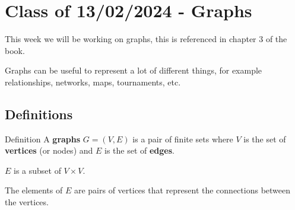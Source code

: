 \documentclass[10pt]{extarticle}
\begin{document}
\section{Class of 13/02/2024 - Graphs}

This week we will be working on graphs, this is referenced in chapter 3 of the book.

\begin{center}

     \label{fig:graph}
\end{center}

Graphs can be useful to represent a lot of different things,
for example relationships, networks, maps, tournaments, etc.

\subsection{Definitions}

\begin{bluebox}{Definition}
    A \textbf{graphs} $G = (V, E)$ is a pair of finite sets where
    $V$ is the set of \textbf{vertices} (or nodes) and $E$ is the set of \textbf{edges}.

    $E$ is a subset of $V \times V$.
\end{bluebox}

The elements of $E$ are pairs of vertices that represent the connections between the vertices.
\end{document}

